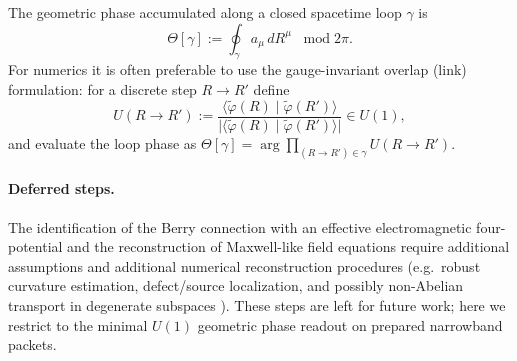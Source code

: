 The geometric phase accumulated along a closed spacetime loop $\gamma$ is
\begin{equation}
  \Theta[\gamma] := \oint_\gamma a_\mu\,dR^\mu \;\;\; \mathrm{mod}\;2\pi.
  \label{eq:berry-phase-loop}
\end{equation}
For numerics it is often preferable to use the gauge-invariant overlap (link) formulation:
for a discrete step $R\to R'$ define
\begin{equation}
  U(R\to R') :=
  \frac{\langle \tilde \varphi(R)\mid \tilde \varphi(R')\rangle}
       {\big|\langle \tilde \varphi(R)\mid \tilde \varphi(R')\rangle\big|}\in U(1),
  \label{eq:u1-link-variable}
\end{equation}
and evaluate the loop phase as $\Theta[\gamma]=\arg\prod_{(R\to R')\in\gamma} U(R\to R')$.

\paragraph{Deferred steps.}
The identification of the Berry connection with an effective electromagnetic four-potential and the
reconstruction of Maxwell-like field equations require additional assumptions and additional numerical reconstruction procedures
(e.g.\ robust curvature estimation, defect/source localization, and possibly non-Abelian transport in
degenerate subspaces \cite{WilczekZee1984}). These steps are left for future work; here we restrict to
the minimal $U(1)$ geometric phase readout on prepared narrowband packets.
